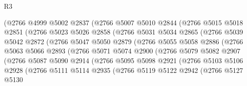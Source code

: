 \begin{lexlean}{R3}
\begin{coremodule}
                (@2766
                  @4999
                  @5002
                  @2837
                  (@2766
                    @5007
                    @5010
                    @2844
                    (@2766
                      @5015
                      @5018
                      @2851
                      (@2766
                        @5023
                        @5026
                        @2858
                        (@2766
                          @5031
                          @5034
                          @2865
                          (@2766
                            @5039
                            @5042
                            @2872
                            (@2766
                              @5047
                              @5050
                              @2879
                              (@2766
                                @5055
                                @5058
                                @2886
                                (@2766
                                  @5063
                                  @5066
                                  @2893
                                  (@2766
                                    @5071
                                    @5074
                                    @2900
                                    (@2766
                                      @5079
                                      @5082
                                      @2907
                                      (@2766
                                        @5087
                                        @5090
                                        @2914
                                        (@2766
                                          @5095
                                          @5098
                                          @2921
                                          (@2766
                                            @5103
                                            @5106
                                            @2928
                                            (@2766
                                              @5111
                                              @5114
                                              @2935
                                              (@2766
                                                @5119
                                                @5122
                                                @2942
                                                (@2766
                                                  @5127
                                                  @5130

\end{coremodule}
\end{lexlean}
